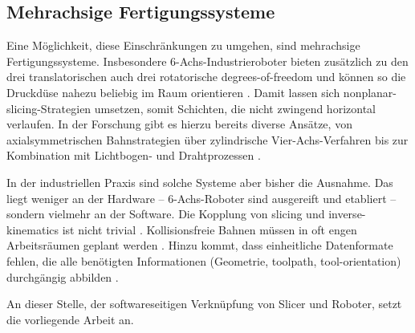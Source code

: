         \subsection{Mehrachsige Fertigungssysteme}\label{subsec:multi-axis-systems-research-industry}
            Eine Möglichkeit, diese Einschränkungen zu umgehen, sind mehrachsige Fertigungssysteme.
            Insbesondere 6-Achs-Industrieroboter bieten zusätzlich zu den drei translatorischen auch drei rotatorische \gls{degrees-of-freedom} und können so die Druckdüse nahezu beliebig im Raum orientieren \autocite[vgl.][S.~536--538]{brandstoetterRoboterbasierter3DDruckMit2023}.
            Damit lassen sich \gls{nonplanar-slicing}-Strategien umsetzen, somit Schichten, die nicht zwingend horizontal verlaufen.
            In der Forschung gibt es hierzu bereits diverse Ansätze, von axialsymmetrischen Bahnstrategien \autocite[vgl.][S.~1--4]{lopez-arrabalAxisymmetricNonplanarSlicing2024} über zylindrische Vier-Achs-Verfahren \autocite[vgl.][S.~494--498]{guerraCylindricalSlicingAlgorithm2025} bis zur Kombination mit Lichtbogen- und Drahtprozessen \autocite[vgl.][S.~66--69]{dingAutomatedRoboticArcweldingbased2016}.

            In der industriellen Praxis sind solche Systeme aber bisher die Ausnahme.
            Das liegt weniger an der Hardware -- 6-Achs-Roboter sind ausgereift und etabliert -- sondern vielmehr an der Software.
            Die Kopplung von \gls{slicing} und \gls{inverse-kinematics} ist nicht trivial \autocite[vgl.][S.~36--40]{aristidouInverseKinematicsTechniques2018}.
            Kollisionsfreie Bahnen müssen in oft engen Arbeitsräumen geplant werden \autocite[vgl.][S.~1--3]{bhattOptimizingPartPlacement2021}.
            Hinzu kommt, dass einheitliche Datenformate fehlen, die alle benötigten Informationen (Geometrie, \gls{toolpath}, \gls{tool-orientation}) durchgängig abbilden \autocite[vgl.][S.~2549--2554]{latifReviewCodeSTEP2021}.

            An dieser Stelle, der softwareseitigen Verknüpfung von Slicer und Roboter, setzt die vorliegende Arbeit an.

